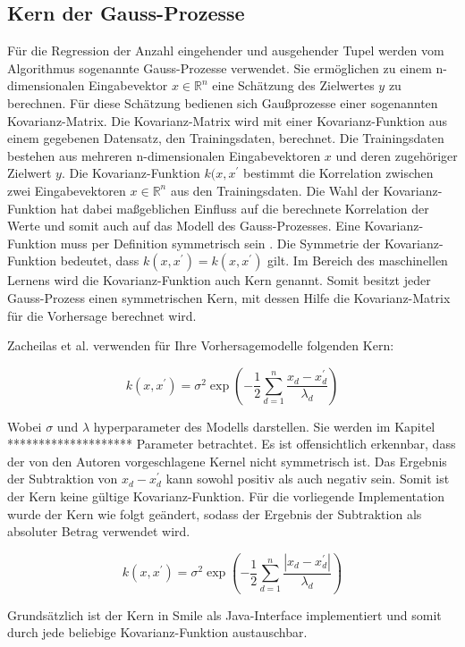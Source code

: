 \subsection{Kern der Gauss-Prozesse}
Für die Regression der Anzahl eingehender und ausgehender Tupel werden vom Algorithmus sogenannte Gauss-Prozesse verwendet.
Sie ermöglichen zu einem n-dimensionalen Eingabevektor \(x \in \mathbb{R}^n\) eine Schätzung des Zielwertes \(y\) zu berechnen.
Für diese Schätzung bedienen sich Gaußprozesse einer sogenannten Kovarianz-Matrix.
Die Kovarianz-Matrix wird mit einer Kovarianz-Funktion aus einem gegebenen Datensatz, den Trainingsdaten, berechnet.
Die Trainingsdaten bestehen aus mehreren n-dimensionalen Eingabevektoren \(x\) und deren zugehöriger Zielwert \(y\).
Die Kovarianz-Funktion \(k(x,x^\prime\) bestimmt die Korrelation zwischen zwei Eingabevektoren \(x \in \mathbb{R}^n\) aus den Trainingsdaten.
Die Wahl der Kovarianz-Funktion hat dabei maßgeblichen Einfluss auf die berechnete Korrelation der Werte und somit auch auf das Modell des Gauss-Prozesses.
Eine Kovarianz-Funktion muss per Definition symmetrisch sein \cite{rasmussen2004gaussian}.
Die Symmetrie der Kovarianz-Funktion bedeutet, dass \(k(x,x^\prime) = k(x,x^\prime)\) gilt.
Im Bereich des maschinellen Lernens wird die Kovarianz-Funktion auch Kern genannt.
Somit besitzt jeder Gauss-Prozess einen symmetrischen Kern, mit dessen Hilfe die Kovarianz-Matrix für die Vorhersage berechnet wird.

Zacheilas et al. verwenden für Ihre Vorhersagemodelle folgenden Kern:

\[k(x, x^\prime) = \sigma^2 \exp{\left( - \frac{1}{2} \sum^{n}_{d=1} \frac{x_d-x_{d}^{\prime}}{\lambda_d}\right)}\]

Wobei \(\sigma\) und \(\lambda\) hyperparameter des Modells darstellen.
Sie werden im Kapitel ******************** Parameter betrachtet.
Es ist offensichtlich erkennbar, dass der von den Autoren vorgeschlagene Kernel nicht symmetrisch ist.
Das Ergebnis der Subtraktion von \(x_d - x^\prime_d\) kann sowohl positiv als auch negativ sein.
Somit ist der Kern keine gültige Kovarianz-Funktion.
Für die vorliegende Implementation wurde der Kern wie folgt geändert, sodass der Ergebnis der Subtraktion als absoluter Betrag verwendet wird.


\[k(x, x^\prime) = \sigma^2 \exp{\left( - \frac{1}{2} \sum^{n}_{d=1} \frac{|x_d-x_{d}^{\prime}|}{\lambda_d}\right)}\]

Grundsätzlich ist der Kern in Smile als Java-Interface implementiert und somit durch jede beliebige Kovarianz-Funktion austauschbar.

